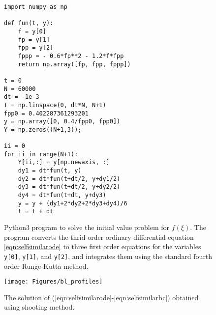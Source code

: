 \documentclass[aps, floatfix, superscriptaddress]{revtex4}
\begin{document}
\begin{figure}
\begin{verbatim}
import numpy as np

def fun(t, y):
    f = y[0]
    fp = y[1]
    fpp = y[2]
    fppp = - 0.6*fp**2 - 1.2*f*fpp 
    return np.array([fp, fpp, fppp])
 
t = 0
N = 60000
dt = -1e-3
T = np.linspace(0, dt*N, N+1)
fpp0 = 0.402287361293201
y = np.array([0, 0.4/fpp0, fpp0])
Y = np.zeros((N+1,3));

ii = 0
for ii in range(N+1):
    Y[ii,:] = y[np.newaxis, :]
    dy1 = dt*fun(t, y)
    dy2 = dt*fun(t+dt/2, y+dy1/2)
    dy3 = dt*fun(t+dt/2, y+dy2/2)
    dy4 = dt*fun(t+dt, y+dy3)
    y = y + (dy1+2*dy2+2*dy3+dy4)/6
    t = t + dt

\end{verbatim}
\caption{Python3 program to solve the initial value problem for $f(\xi)$. The program converts the thrid order ordinary differential equation \eqref{eqn:selfsimilarode} to three first order equations for the variables \texttt{y[0]}, \texttt{y[1]}, and \texttt{y[2]}, and integrates them using the standard fourth order Runge-Kutta method.}
\label{fig:python3program}
\end{figure}

\begin{figure}
\texttt{[image: Figures/bl\_profiles]}
\caption{The solution of (\ref{eqn:selfsimilarode}-\ref{eqn:selfsimilarbc}) obtained using shooting method.} 
\label{fig:similaritysoln}
\end{figure}
\end{document}
